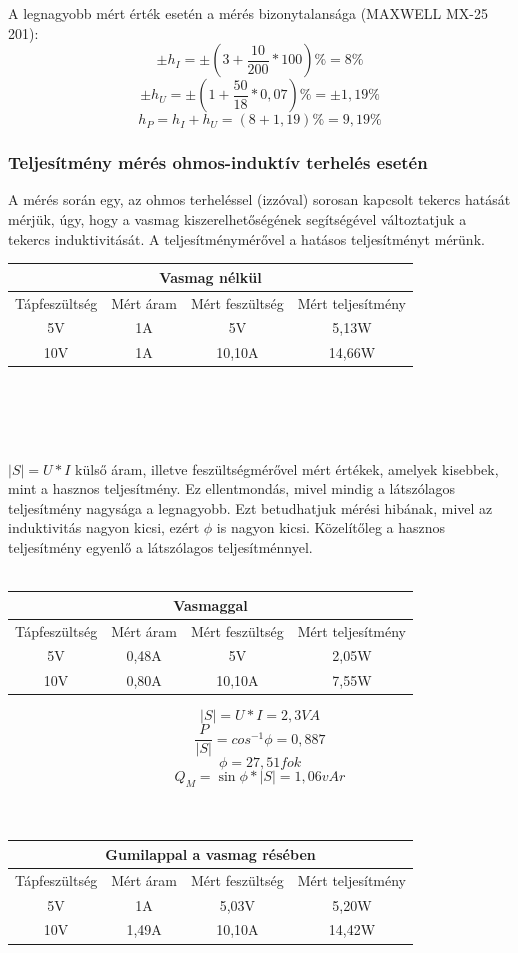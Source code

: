 \documentclass[10pt,a4paper]{article}
\begin{document}
\newpage
A legnagyobb mért érték esetén a mérés bizonytalansága (MAXWELL MX-25 201):$$\pm h_I=\pm \left(3 + \frac{10}{200} * 100 \right)\% = 8\%$$ $$\pm h_U = \pm \left(1 + \frac{50}{18} * 0,07 \right)\% = \pm 1,19\%$$ $$h_P = h_I + h_U = \left(8+1,19\right)\% = 9,19\%$$
			 \subsubsection{Teljesítmény mérés ohmos-induktív terhelés esetén}
A mérés során egy, az ohmos terheléssel (izzóval) sorosan kapcsolt tekercs hatását mérjük, úgy, hogy a vasmag kiszerelhetőségének segítségével változtatjuk a tekercs induktivitását.
A teljesítménymérővel a hatásos teljesítményt mérünk.
\begin{tabular}{|c|c|c|c|}
\hline 
\multicolumn{4}{|c|}{Vasmag nélkül} \\ 
\hline 
Tápfeszültség & Mért áram & Mért feszültség & Mért teljesítmény \\ 
\hline 
5V & 1A & 5V & 5,13W \\ 
\hline 
10V & 1A & 10,10A & 14,66W \\ 
\hline 
\end{tabular} \\\\
\\\\ $\left|S\right| = U*I$ külső áram, illetve feszültségmérővel mért értékek, amelyek kisebbek, mint a hasznos teljesítmény. Ez ellentmondás, mivel mindig a látszólagos teljesítmény nagysága a legnagyobb. 
Ezt betudhatjuk mérési hibának, mivel az induktivitás nagyon kicsi, ezért $\phi$ is nagyon kicsi.
Közelítőleg a hasznos teljesítmény egyenlő a látszólagos teljesítménnyel.\\\\
\begin{tabular}{|c|c|c|c|}
\hline 
\multicolumn{4}{|c|}{Vasmaggal} \\ 
\hline 
Tápfeszültség & Mért áram & Mért feszültség & Mért teljesítmény \\ 
\hline 
5V & 0,48A & 5V & 2,05W \\ 
\hline 
10V & 0,80A & 10,10A & 7,55W \\ 
\hline 
\end{tabular}
$$\left|S\right| = U*I = 2,3 VA$$
$$\frac{P}{\left|S\right|} = cos^{-1} \phi = 0,887$$
$$\phi = 27,51 fok$$
$$Q_{M} = \sin \phi * \left|S\right| = 1,06 vAr$$\\\\
\begin{tabular}{|c|c|c|c|}
\hline 
\multicolumn{4}{|c|}{Gumilappal a vasmag résében} \\ 
\hline 
Tápfeszültség & Mért áram & Mért feszültség & Mért teljesítmény \\ 
\hline 
5V & 1A & 5,03V & 5,20W \\ 
\hline 
10V & 1,49A & 10,10A & 14,42W \\ 
\hline 
\end{tabular}
\end{document}
